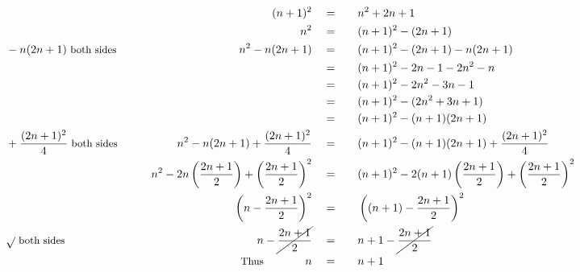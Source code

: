 \begin{alignat*}{5}
&\,&(n+1)^2\quad&=\quad&&n^2+2n+1\\
&\,&n^2\quad&=&&(n+1)^2-(2n+1)\\
&\small-n(2n+1)\text{ both sides}&n^2-n(2n+1)\quad&=&&(n+1)^2-(2n+1)-n(2n+1)\\
&\,&\,&=&&(n+1)^2-2n-1-2n^2-n\\
&\,&\,&=&&(n+1)^2-2n^2-3n-1\\
&\,&\,&=&&(n+1)^2-(2n^2+3n+1)\\
&\,&\,&=&&(n+1)^2-(n+1)(2n+1)\\
&\small+\frac{(2n+1)^2}{4}\text{ both sides}\normalsize\qquad&n^2-n(2n+1)+\frac{(2n+1)^2}{4}\quad&=&&(n+1)^2-(n+1)(2n+1)+\frac{(2n+1)^2}{4}\\
&\,&n^2-2n\left(\frac{2n+1}{2}\right)+\left(\frac{2n+1}{2}\right)^2\quad&=&&(n+1)^2-2(n+1)\left(\frac{2n+1}{2}\right)+\left(\frac{2n+1}{2}\right)^2\\
&\,&\left(n-\frac{2n+1}{2}\right)^2\quad&=&&\left((n+1)-\frac{2n+1}{2}\right)^2\\
&\small\sqrt{}\text{ both sides}&n-\cancel{\frac{2n+1}{2}}\quad&=&&n+1-\cancel{\frac{2n+1}{2}}\\
&\,&\small\text{Thus}\qquad\qquad\normalsize n\quad&=&&n+1
\end{alignat*}
